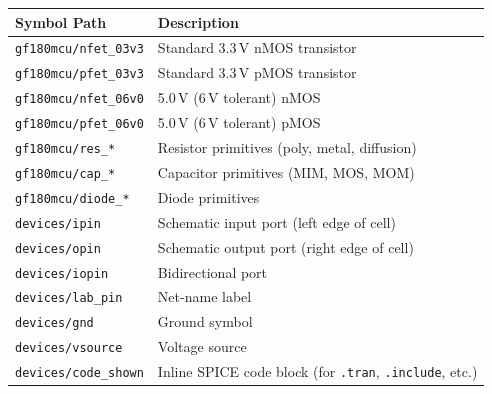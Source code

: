 \documentclass[11pt]{article}
\begin{document}
\begin{center}
\begin{tabular}{@{}lp{9cm}@{}}
\toprule
\textbf{Symbol Path}                          & \textbf{Description} \\
\midrule
\texttt{gf180mcu/nfet\_03v3}                  & Standard 3.3\,V nMOS
                                                transistor \\
\texttt{gf180mcu/pfet\_03v3}                  & Standard 3.3\,V pMOS
                                                transistor \\
\texttt{gf180mcu/nfet\_06v0}                  & 5.0\,V (6\,V tolerant)
                                                nMOS \\
\texttt{gf180mcu/pfet\_06v0}                  & 5.0\,V (6\,V tolerant)
                                                pMOS \\
\texttt{gf180mcu/res\_*}                      & Resistor primitives
                                                (poly, metal, diffusion) \\
\texttt{gf180mcu/cap\_*}                      & Capacitor primitives
                                                (MIM, MOS, MOM) \\
\texttt{gf180mcu/diode\_*}                    & Diode primitives \\
\texttt{devices/ipin}                         & Schematic input port
                                                (left edge of cell) \\
\texttt{devices/opin}                         & Schematic output port
                                                (right edge of cell) \\
\texttt{devices/iopin}                        & Bidirectional port \\
\texttt{devices/lab\_pin}                     & Net-name label \\
\texttt{devices/gnd}                          & Ground symbol \\
\texttt{devices/vsource}                      & Voltage source \\
\texttt{devices/code\_shown}                  & Inline SPICE code block
                                                (for \texttt{.tran},
                                                \texttt{.include}, etc.) \\
\bottomrule
\end{tabular}
\end{center}
\end{document}
